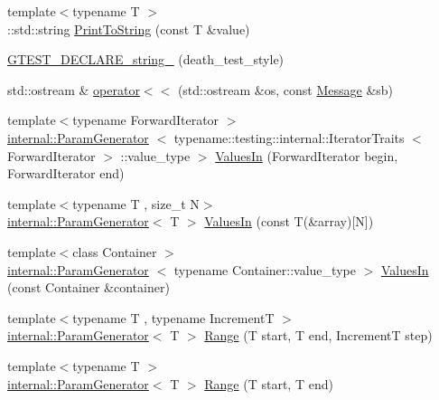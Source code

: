 \begin{DoxyCompactItemize}
\item 
{\footnotesize template$<$typename T $>$ }\\\-::std\-::string \hyperlink{namespacetesting_a44c473dd1caaed17b53a19dff4e4f7ef}{\-Print\-To\-String} (const \-T \&value)
\item 
\hyperlink{namespacetesting_a01dc67468f68811e10b5feab417f8220}{\-G\-T\-E\-S\-T\-\_\-\-D\-E\-C\-L\-A\-R\-E\-\_\-string\-\_\-} (death\-\_\-test\-\_\-style)
\item 
std\-::ostream \& \hyperlink{namespacetesting_ae899d580f107a7756f3444213e211504}{operator$<$$<$} (std\-::ostream \&os, const \hyperlink{classtesting_1_1Message}{\-Message} \&sb)
\item 
{\footnotesize template$<$typename Forward\-Iterator $>$ }\\\hyperlink{classtesting_1_1internal_1_1ParamGenerator}{internal\-::\-Param\-Generator}\*
$<$ typename\-::testing\-::internal\-::\-Iterator\-Traits\*
$<$ \-Forward\-Iterator $>$\*
\-::value\-\_\-type $>$ \hyperlink{namespacetesting_a538dc2f2434b56784a19e073e6c03aae}{\-Values\-In} (\-Forward\-Iterator begin, \-Forward\-Iterator end)
\item 
{\footnotesize template$<$typename T , size\-\_\-t \-N$>$ }\\\hyperlink{classtesting_1_1internal_1_1ParamGenerator}{internal\-::\-Param\-Generator}$<$ \-T $>$ \hyperlink{namespacetesting_a18520d1610a411dc6ed84c2e8e3a00a8}{\-Values\-In} (const \-T(\&array)\mbox{[}\-N\mbox{]})
\item 
{\footnotesize template$<$class Container $>$ }\\\hyperlink{classtesting_1_1internal_1_1ParamGenerator}{internal\-::\-Param\-Generator}\*
$<$ typename \*
\-Container\-::value\-\_\-type $>$ \hyperlink{namespacetesting_af51aa340f8799c6f66852c2637c396d4}{\-Values\-In} (const \-Container \&container)
\item 
{\footnotesize template$<$typename T , typename Increment\-T $>$ }\\\hyperlink{classtesting_1_1internal_1_1ParamGenerator}{internal\-::\-Param\-Generator}$<$ \-T $>$ \hyperlink{namespacetesting_a265ed70a86cf2d6641582c45ad9529e2}{\-Range} (\-T start, \-T end, \-Increment\-T step)
\item 
{\footnotesize template$<$typename T $>$ }\\\hyperlink{classtesting_1_1internal_1_1ParamGenerator}{internal\-::\-Param\-Generator}$<$ \-T $>$ \hyperlink{namespacetesting_a56a45f85a1238dfc92e6fca03eb3a2e4}{\-Range} (\-T start, \-T end)
\item 

\end{DoxyCompactItemize}
